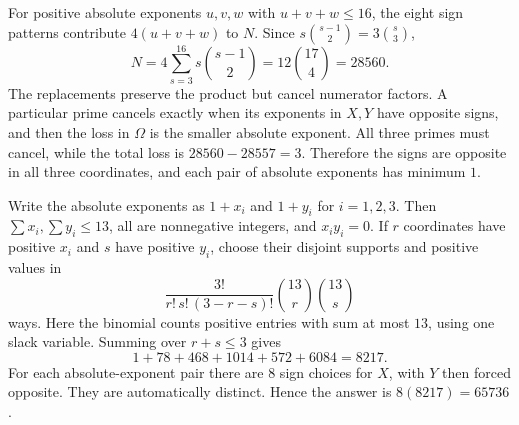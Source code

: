 For positive absolute exponents $u,v,w$ with $u+v+w\le16$, the eight sign patterns contribute $4(u+v+w)$ to $N$. Since $s\binom{s-1}{2}=3\binom s3$,
\[
N=4\sum_{s=3}^{16}s\binom{s-1}{2}
=12\binom{17}{4}=28560.
\]
The replacements preserve the product but cancel numerator factors. A particular prime cancels exactly when its exponents in $X,Y$ have opposite signs, and then the loss in $\Omega$ is the smaller absolute exponent. All three primes must cancel, while the total loss is $28560-28557=3$. Therefore the signs are opposite in all three coordinates, and each pair of absolute exponents has minimum $1$.

Write the absolute exponents as $1+x_i$ and $1+y_i$ for $i=1,2,3$. Then $\sum x_i,\sum y_i\le13$, all are nonnegative integers, and $x_iy_i=0$. If $r$ coordinates have positive $x_i$ and $s$ have positive $y_i$, choose their disjoint supports and positive values in
\[
\dfrac{3!}{r!\,s!\,(3-r-s)!}\binom{13}{r}\binom{13}{s}
\]
ways. Here the binomial counts positive entries with sum at most $13$, using one slack variable. Summing over $r+s\le3$ gives
\[
1+78+468+1014+572+6084=8217.
\]
For each absolute-exponent pair there are $8$ sign choices for $X$, with $Y$ then forced opposite. They are automatically distinct. Hence the answer is $\boxed{8(8217)=65736}$.
